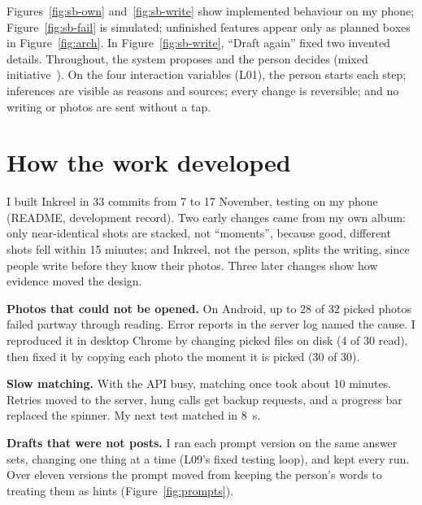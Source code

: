 \documentclass[11pt,a4paper]{article}
\begin{document}
Figures~\ref{fig:sb-own} and~\ref{fig:sb-write} show implemented behaviour on my phone;
Figure~\ref{fig:sb-fail} is simulated; unfinished features appear only as planned boxes in
Figure~\ref{fig:arch}. In Figure~\ref{fig:sb-write}, ``Draft again'' fixed two invented
details. Throughout, the system
proposes and the person decides (mixed initiative~\cite{horvitz_principles_1999}). On the four
interaction variables (L01), the person starts each step; inferences are visible as reasons and
sources; every change is reversible; and no writing or photos are sent without a tap.



\section{How the work developed}

I built Inkreel in 33 commits from 7 to 17 November, testing on my phone (README, development
record). Two early changes came from my own album: only near-identical shots are stacked, not
``moments'', because good, different shots fell within 15 minutes; and Inkreel, not the person,
splits the writing, since people write before they know their photos. Three later changes show how evidence moved the
design.

\textbf{Photos that could not be opened.} On Android, up to 28 of 32 picked photos failed partway
through reading. Error reports in the server log named the cause. I reproduced it in desktop
Chrome by changing picked files on disk (4 of 30 read), then fixed it by copying each photo the
moment it is picked (30 of 30).

\textbf{Slow matching.} With the API busy, matching once took about 10 minutes. Retries moved to
the server, hung calls get backup requests, and a progress bar replaced the spinner. My next test
matched in 8~s.

\textbf{Drafts that were not posts.} I ran each prompt version on the same answer sets, changing
one thing at a time (L09's fixed testing loop), and kept every run. Over eleven versions the
prompt moved from keeping the person's words to treating them as hints (Figure~\ref{fig:prompts}).
\end{document}

